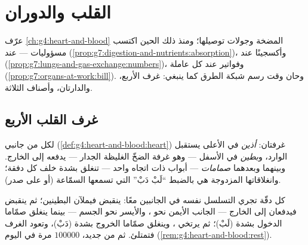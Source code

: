 \chapter{القلب والدوران}\label{ch:g7:heart-and-circulation}

عرّف \cref{ch:g4:heart-and-blood} المضخة وجولات توصيلها؛ ومنذ ذلك
الحين اكتسب  مسؤوليات ---  عند 
(\cref{prop:g7:digestion-and-nutrients:absorption})، وأكسجينًا عند
 (\cref{prop:g7:lungs-and-gas-exchange:numbers})، وفواتير
عند كل  عاملة (\cref{prop:g7:organs-at-work:bill}). وحان وقت
رسم شبكة الطرق كما ينبغي: غرف  الأربع، والدارتان، وأصناف
 الثلاثة.

\section{غرف القلب الأربع}

\begin{definition}\label{def:g7:heart-and-circulation:rooms}
لكل من جانبي  (\cref{def:g4:heart-and-blood:heart}) غرفتان:
\emph{أذين} في الأعلى يستقبل  الوارد،
و\emph{بطين} في الأسفل --- وهو غرفة الضخّ الغليظة
الجدار --- يدفعه إلى الخارج. وبينهما وبعدهما
\emph{صمامات} --- أبواب ذات اتجاه واحد ---
تنغلق بشدة خلف كل دفقة؛ وانغلاقاتها المزدوجة هي بالضبط ``لَبْ
دَبْ'' التي تسمعها السمّاعة (أو  على صدر).
\end{definition}

\begin{proposition}\label{prop:g7:heart-and-circulation:beat}
كل دقّة تجري التسلسل نفسه في الجانبين معًا: ينقبض  فيملآن
البطينين؛ ثم ينقبض  فيدفعان  إلى الخارج --- الجانب
الأيمن نحو ، والأيسر نحو الجسم --- بينما ينغلق صمّاما
الدخول بشدة (لَبْ)؛ ثم يرتخي ، وينغلق صمّاما الخروج بشدة
(دَبْ)، وتعود الغرف فتمتلئ. ثم من جديد، $100000$ مرة في اليوم
(\cref{rem:g4:heart-and-blood:rest}).
\end{proposition}
\admitted

